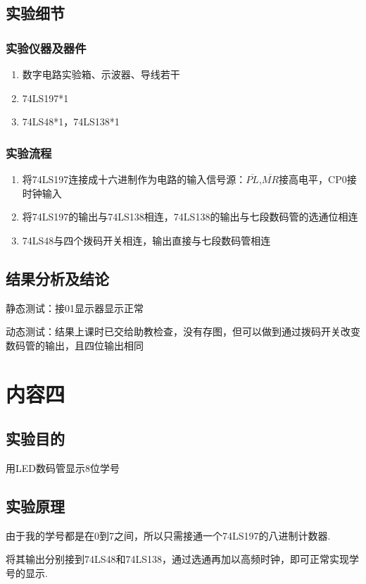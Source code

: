 \documentclass[11pt,UTF8]{ctexart}
\begin{document}
\subsection{实验细节}
\subsubsection{实验仪器及器件}
\begin{enumerate}
    \item 数字电路实验箱、示波器、导线若干
    \item 74LS197*1
    \item 74LS48*1，74LS138*1
\end{enumerate}

\subsubsection{实验流程}
\begin{enumerate}
    \item 将74LS197连接成十六进制作为电路的输入信号源：$\overline{PL}$,$\overline{MR}$接高电平，CP0接时钟输入
    \item 将74LS197的输出与74LS138相连，74LS138的输出与七段数码管的选通位相连
    \item 74LS48与四个拨码开关相连，输出直接与七段数码管相连
\end{enumerate}

\subsection{结果分析及结论}
\par 静态测试：接01显示器显示正常
\par 动态测试：结果上课时已交给助教检查，没有存图，但可以做到通过拨码开关改变数码管的输出，且四位输出相同


\section{内容四}
\subsection{实验目的}
用LED数码管显示8位学号

\subsection{实验原理}
\par 由于我的学号都是在0到7之间，所以只需接通一个74LS197的八进制计数器.
\par 将其输出分别接到74LS48和74LS138，通过选通再加以高频时钟，即可正常实现学号的显示.
\end{document}
